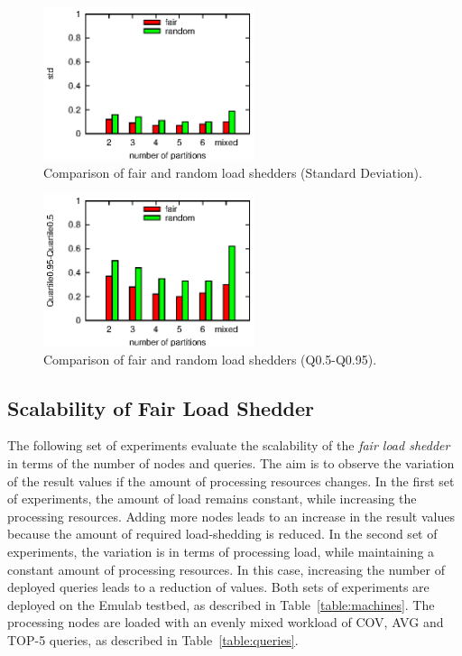 \begin{figure}[h!]
\centering
\includegraphics[width=0.55\textwidth]{img/tesi/std}
\caption{Comparison of fair and random load shedders (Standard Deviation). }
\label{fig:std}
\end{figure}
\begin{figure}[h!]
\centering
\includegraphics[width=0.55\textwidth]{img/tesi/maxmin}
\caption{Comparison of fair and random load shedders (Q0.5-Q0.95).}
\label{fig:qq}
\end{figure}



\subsection*{Scalability of Fair Load Shedder }

The following set of experiments evaluate the scalability of the \emph{fair load shedder} in
terms of the number of nodes and queries. The aim is to observe the variation of the result \sic values
if the amount of processing resources changes. In the first set of experiments, the amount of load
remains constant, while increasing the processing resources.
Adding more nodes leads to an increase in the result \sic values because the amount of required
\mbox{load-shedding} is reduced. In the second set of experiments, the variation is in terms of
processing load, while maintaining a constant amount of processing resources. In this case, increasing
the number of deployed queries leads to a reduction of \sic values. 
Both sets of experiments are deployed on the Emulab testbed, as described in Table~\ref{table:machines}.
The processing nodes are loaded with an evenly mixed workload of
COV, AVG and TOP-5 queries, as described in Table~\ref{table:queries}.
\vspace{-10pt}
